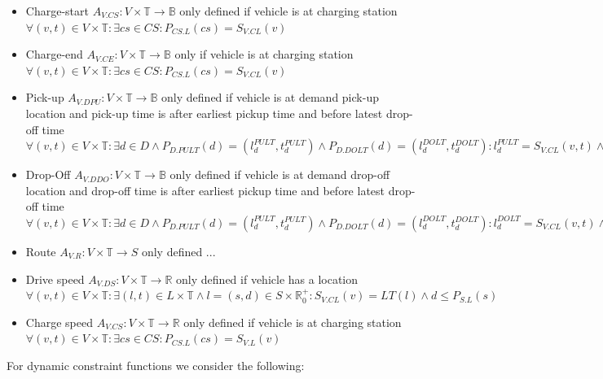 \documentclass[graybox]{svmult}
\begin{document}
\begin{itemize}
	\item Charge-start $A_{V.CS}: V \times \mathbb{T} \rightarrow \mathbb{B}$ only defined if vehicle is at charging station $\forall (v,t) \in V \times \mathbb{T}: \exists cs \in CS: P_{CS.L}(cs) = S_{V.CL}(v)$
	\item Charge-end $A_{V.CE}: V \times \mathbb{T} \rightarrow \mathbb{B}$ only if vehicle is at charging station $\forall (v,t) \in V \times \mathbb{T}: \exists cs \in CS: P_{CS.L}(cs) = S_{V.CL}(v)$
	\item Pick-up $A_{V.DPU}: V \times \mathbb{T} \rightarrow \mathbb{B}$ only defined if vehicle is at demand pick-up location and pick-up time is after earliest pickup time and before latest drop-off time $\forall (v,t) \in V \times \mathbb{T}: \exists d \in D \wedge  P_{D.PULT}(d) = (l_d^{PULT},t_d^{PULT}) \wedge P_{D.DOLT}(d) = (l_d^{DOLT},t_d^{DOLT}): l_d^{PULT} = S_{V.CL}(v,t) \wedge t_d^{PULT} \leq t \leq t_d^{DOLT}$
	\item Drop-Off $A_{V.DDO}: V \times \mathbb{T} \rightarrow \mathbb{B}$ only defined if vehicle is at demand drop-off location and drop-off time is after earliest pickup time and before latest drop-off time $\forall (v,t) \in V \times \mathbb{T}: \exists d \in D \wedge  P_{D.PULT}(d) = (l_d^{PULT},t_d^{PULT}) \wedge P_{D.DOLT}(d) = (l_d^{DOLT},t_d^{DOLT}): l_d^{DOLT} = S_{V.CL}(v,t) \wedge t_d^{PULT} \leq t \leq t_d^{DOLT}$
	\item Route $A_{V.R}: V \times \mathbb{T} \rightarrow S$ only defined ...
	\item Drive speed $A_{V.DS}: V \times \mathbb{T} \rightarrow \mathbb{R}$ only defined if vehicle has a location $\forall (v,t) \in V \times \mathbb{T}: \exists (l, t) \in L \times \mathbb{T} \wedge l = (s, d) \in S \times \mathbb{R}_0^+: S_{V.CL}(v) = LT(l) \wedge d \leq P_{S.L}(s)$
	

	
	\item Charge speed $A_{V.CS}: V \times \mathbb{T} \rightarrow \mathbb{R}$ only defined if vehicle is at charging station $\forall (v,t) \in V \times \mathbb{T}: \exists cs \in CS: P_{CS.L}(cs) = S_{V.L}(v)$
\end{itemize}
For dynamic constraint functions we consider the following:
\end{document}
